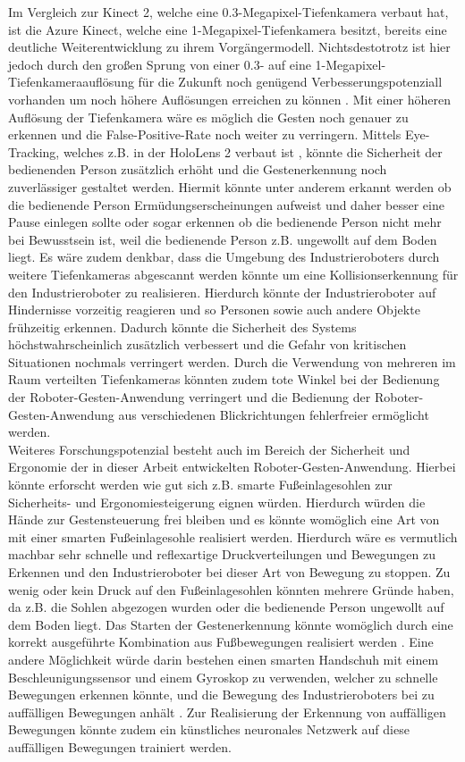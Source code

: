 Im Vergleich zur Kinect 2, welche eine \num{0,3}-Megapixel-Tiefenkamera verbaut hat, ist die Azure Kinect, welche eine 1-Megapixel-Tiefenkamera besitzt, bereits eine deutliche Weiterentwicklung zu ihrem Vorgängermodell. Nichtsdestotrotz ist hier jedoch durch den großen Sprung von einer \num{0,3}- auf eine 1-Megapixel-Tiefenkameraauflösung für die Zukunft noch genügend Verbesserungspotenziall vorhanden um noch höhere Auflösungen erreichen zu können \cite{bamji__2018}. Mit einer höheren Auflösung der Tiefenkamera wäre es möglich die Gesten noch genauer zu erkennen und die False-Positive-Rate noch weiter zu verringern. Mittels Eye-Tracking, welches z.B. in der HoloLens 2 verbaut ist \cite{hololens2_hardware_nodate}, könnte die Sicherheit der bedienenden Person zusätzlich erhöht und die Gestenerkennung noch zuverlässiger gestaltet werden. Hiermit könnte unter anderem erkannt werden ob die bedienende Person Ermüdungserscheinungen aufweist und daher besser eine Pause einlegen sollte oder sogar erkennen ob die bedienende Person nicht mehr bei Bewusstsein ist, weil die bedienende Person z.B. ungewollt auf dem Boden liegt. Es wäre zudem denkbar, dass die Umgebung des Industrieroboters durch weitere Tiefenkameras abgescannt werden könnte um eine Kollisionserkennung für den Industrieroboter zu realisieren. Hierdurch könnte der Industrieroboter auf Hindernisse vorzeitig reagieren und so Personen sowie auch andere Objekte frühzeitig erkennen. Dadurch könnte die Sicherheit des Systems höchstwahrscheinlich zusätzlich verbessert und die Gefahr von kritischen Situationen nochmals verringert werden. Durch die Verwendung von mehreren im Raum verteilten Tiefenkameras könnten zudem tote Winkel bei der Bedienung der Roboter-Gesten-Anwendung verringert und die Bedienung der Roboter-Gesten-Anwendung aus verschiedenen Blickrichtungen fehlerfreier ermöglicht werden.\\

Weiteres Forschungspotenzial besteht auch im Bereich der Sicherheit und Ergonomie der in dieser Arbeit entwickelten Roboter-Gesten-Anwendung. Hierbei könnte erforscht werden wie gut sich z.B. smarte Fußeinlagesohlen zur Sicherheits- und Ergonomiesteigerung eignen würden. Hierdurch würden die Hände zur Gestensteuerung frei bleiben und es könnte womöglich eine Art von  mit einer smarten Fußeinlagesohle realisiert werden. Hierdurch wäre es vermutlich machbar sehr schnelle und reflexartige Druckverteilungen und Bewegungen zu Erkennen und den Industrieroboter bei dieser Art von Bewegung zu stoppen. Zu wenig oder kein Druck auf den Fußeinlagesohlen könnten mehrere Gründe haben, da z.B. die Sohlen abgezogen wurden oder die bedienende Person ungewollt auf dem Boden liegt. Das Starten der Gestenerkennung könnte womöglich durch eine korrekt ausgeführte Kombination aus Fußbewegungen realisiert werden \cite{tan_design_2015}. Eine andere Möglichkeit würde darin bestehen einen smarten Handschuh mit einem Beschleunigungssensor und einem Gyroskop zu verwenden, welcher zu schnelle Bewegungen erkennen könnte, und die Bewegung des Industrieroboters bei zu auffälligen Bewegungen anhält \cite{ghimire_smart_2019}. Zur Realisierung der Erkennung von auffälligen Bewegungen könnte zudem ein künstliches neuronales Netzwerk auf diese auffälligen Bewegungen trainiert werden.
